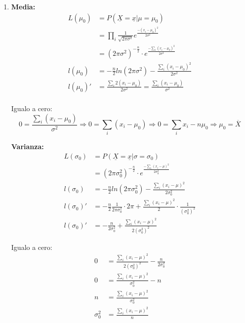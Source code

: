 \begin{enumerate}
	\item
		\textbf{Media:}
		\begin{align*}
			L(\mu_0)	& = P(\underline X = \underline x|\mu=\mu_0)	\\
						& = \prod_i \frac{1}{\sqrt{2\pi\sigma^2}} e^{\frac{-(x_i - \mu_0)^2}{2\sigma^2}}		\\
						& = (2\pi\sigma^2)^{-\frac{n}{2}} \cdot e^{\frac{-\sum_i(x_i - \mu_0)^2}{2\sigma^2}}	\\
			l(\mu_0)	& = -\frac{n}{2}ln(2\pi\sigma^2) - \frac{\sum_i(x_i - \mu_0)^2}{2\sigma^2}				\\
			l(\mu_0)'	& = \frac{\sum_i 2(x_i - \mu_0)}{2\sigma^2}	= \frac{\sum_i (x_i - \mu_0)}{\sigma^2}		\\
		\end{align*}
		
		Igualo a cero:
			$$0 = \frac{\sum_i (x_i - \mu_0)}{\sigma^2}
				\Rightarrow 0 = \sum_i (x_i - \mu_0)
				\Rightarrow 0 = \sum_i x_i - n\mu_0
				\Rightarrow \mu_0 = \overline X$$
				
		\textbf{Varianza:}
		\begin{align*}
			L(\sigma_0)		& = P(\underline X = \underline x|\sigma=\sigma_0)	\\
							& = (2\pi\sigma_0^2)^{-\frac{n}{2}} \cdot e^{\frac{-\sum_i(x_i - \mu)^2}{2\sigma_0^2}}	\\
			l(\sigma_0)		& = -\frac{n}{2}ln(2\pi\sigma_0^2) - \frac{\sum_i(x_i - \mu)^2}{2\sigma_0^2}			\\
			l(\sigma_0)'	& = -\frac{n}{2}\frac{1}{2\pi\sigma_0^2}\cdot 2\pi + \frac{\sum_i(x_i - \mu)^2}{2}\cdot \frac{1}{(\sigma_0^2)^2}	\\
			l(\sigma_0)'	& = -\frac{n}{2\sigma_0^2} + \frac{\sum_i(x_i - \mu)^2}{2(\sigma_0^2)^2}
		\end{align*}
		
		Igualo a cero:
		\begin{align*}
			0			& = \frac{\sum_i(x_i - \mu)^2}{2(\sigma_0^2)^2} - \frac{n}{2\sigma_0^2}	\\
			0			& = \frac{\sum_i(x_i - \mu)^2}{\sigma_0^2} - n	\\
			n			& = \frac{\sum_i(x_i - \mu)^2}{\sigma_0^2}		\\
			\sigma_0^2	& = \frac{\sum_i(x_i - \mu)^2}{n}
		\end{align*}
		

\end{enumerate}
